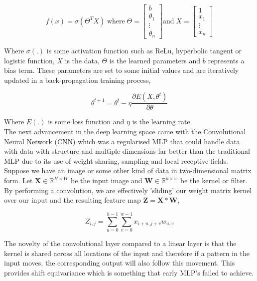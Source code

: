 \documentclass[honours,12pt]{unswthesis}
\numberwithin{equation}{section}
\begin{document}
\begin{equation}
    f(x) = \sigma(\Theta^T X)  \; \text{where}  \; \Theta= \begin{bmatrix} b \\ \theta_1 \\ \vdots \\ \theta_n \end{bmatrix} \text{and} \; X = \begin{bmatrix} 1 \\ x_1 \\ \vdots \\ x_n \end{bmatrix}
\end{equation}

\noindent Where $\sigma(.)$ is some activation function such as ReLu, hyperbolic tangent or logistic function, $X$ is the data, $\Theta$ is the learned parameters and $b$ represents a bias term.
These parameters are set to some initial values and are iteratively updated in a back-propagation training process,

\begin{equation}
    \theta^{t+1} = \theta^{t} - \eta\frac{\partial E(X, \theta^t)}{\partial\theta}
\end{equation}

\noindent Where $E(.)$ is some loss function and $\eta$ is the learning rate. \\

\noindent The next advancement in the deep learning space came with the Convolutional Neural Network (CNN) which was a regularised MLP that could
handle data with data with structure and multiple dimensions far better than the traditional MLP due to its use of weight sharing, 
sampling and local receptive fields.\cite{Goodfellow-et-al-2016}
Suppose we have an image or some other kind of data in two-dimensional matrix form. Let $\textbf{X} \in \mathbb{R}^{H\times W}$ be the input image and
$\textbf{W} \in \mathbb{R}^{h\times w}$ be the kernel or filter. By performing a convolution, we are effectively 'sliding' our weight matrix kernel
over our input and the resulting feature map $\textbf{Z} = \textbf{X} \ast \textbf{W}$,

\begin{equation}
    Z_{i, j} = \sum_{u=0}^{h-1}\sum_{v=0}^{w-1} x_{i+u, j+v} w_{u, v}
\end{equation}

\noindent The novelty of the convolutional layer compared to a linear layer is that the kernel is shared across all locations of the input and therefore
if a pattern in the input moves, the corresponding output will also follow this movement. This provides shift equivariance which is something that early MLP's
failed to achieve.\cite{pml1Book}
\end{document}

